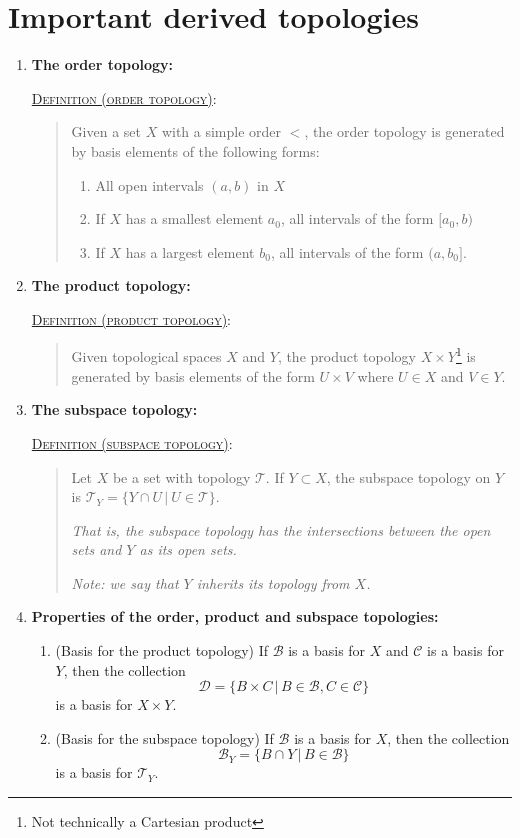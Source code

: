 \documentclass[letterpaper, 12pt]{book}
\newcommand{\ms}[1]{\mathscr{#1}}
\newcommand{\defn}[2]{\textsc{\underline{Definition (#1)}:}\begin{quote} #2\end{quote}}
\begin{document}
\section{Important derived topologies}
    \begin{enumerate}[resume]
    \item \textbf{The order topology:}

        \defn{order topology}{Given a set $X$ with a simple order $<$, the order topology is generated by basis elements of the following forms:
        \begin{enumerate}
        \item All open intervals $(a, b)$ in $X$
        \item If $X$ has a smallest element $a_0$, all intervals of the form $[a_0, b)$
        \item If $X$ has a largest element $b_0$, all intervals of the form $(a, b_0]$.
        \end{enumerate}
        }
    \item \textbf{The product topology:}

        \defn{product topology}{Given topological spaces $X$ and $Y$, the product topology $X\times Y$\footnote{Not technically a Cartesian product} is generated by basis elements of the form $U\times V$ where $U\in X$ and $V\in Y$.}
    \item \textbf{The subspace topology:}

        \defn{subspace topology}{Let $X$ be a set with topology $\ms{T}$. If $Y\subset X$, the subspace topology on $Y$ is $\ms{T}_Y = \{Y\cap U\,|\ U\in\ms{T}\}$.

        \textit{That is, the subspace topology has the intersections between the open sets and $Y$ as its open sets.}

        \textit{Note: we say that $Y$ inherits its topology from $X$.}}
    \item \textbf{Properties of the order, product and subspace topologies:}
        \begin{enumerate}
        \item (Basis for the product topology) If $\ms{B}$ is a basis for $X$ and $\ms{C}$ is a basis for $Y$, then the collection \[\ms{D} = \{B\times C\,|\, B\in\ms{B}, C\in\ms{C}\}\] is a basis for $X\times Y$.
        \item (Basis for the subspace topology) If $\ms{B}$ is a basis for $X$, then the collection \[\ms{B}_Y = \{B \cap Y\,|\, B\in\ms{B}\}\] is a basis for $\ms{T}_Y$.


\end{enumerate}
\end{enumerate}
\end{document}
